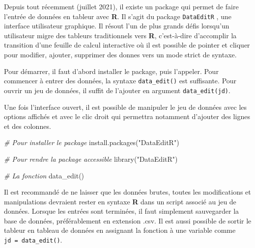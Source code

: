 \documentclass[
]{book}
\newenvironment{Shaded}{}{}
\newcommand{\CommentTok}[1]{\textit{#1}}
\newcommand{\FunctionTok}[1]{#1}
\newcommand{\NormalTok}[1]{#1}
\newcommand{\StringTok}[1]{#1}
\begin{document}
Depuis tout récemment (juillet 2021), il existe un package qui permet de faire l'entrée de données en tableur avec \textbf{R}. Il s'agit du package \texttt{DataEditR} \autocite{DataEditR}, une interface utilisateur graphique. Il résout l'un de plus grands défis lorsqu'un utilisateur migre des tableurs traditionnels vers \textbf{R}, c'est-à-dire d'accomplir la transition d'une feuille de calcul interactive où il est possible de pointer et cliquer pour modifier, ajouter, supprimer des donnes vers un mode strict de syntaxe.

Pour démarrer, il faut d'abord installer le package, puis l'appeler. Pour commencer à entrer des données, la syntaxe \texttt{data\_edit()} est suffisante. Pour ouvrir un jeu de données, il suffit de l'ajouter en argument \texttt{data\_edit(jd)}.

Une fois l'interface ouvert, il est possible de manipuler le jeu de données avec les options affichés et avec le clic droit qui permettra notamment d'ajouter des lignes et des colonnes.

\begin{Shaded}
\begin{Highlighting}[]
\CommentTok{\# Pour installer le package}
\FunctionTok{install.packages}\NormalTok{(}\StringTok{"DataEditR"}\NormalTok{)}

\CommentTok{\# Pour rendre la package accessible}
\FunctionTok{library}\NormalTok{(}\StringTok{"DataEditR"}\NormalTok{)}

\CommentTok{\# La fonction}
\FunctionTok{data\_edit}\NormalTok{()}
\end{Highlighting}
\end{Shaded}

Il est recommandé de ne laisser que les données brutes, toutes les modifications et manipulations devraient rester en syntaxe \textbf{R} dans un script associé au jeu de données. Lorsque les entrées sont terminées, il faut simplement sauvegarder la base de données, préférablement en extension .csv. Il est aussi possible de sortir le tableur en tableau de données en assignant la fonction à une variable comme \texttt{jd\ =\ data\_edit()}.
\end{document}
